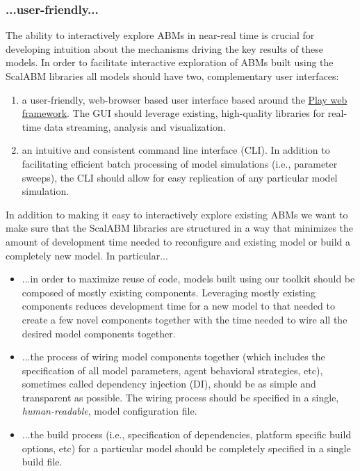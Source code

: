 \documentclass[11pt]{amsart}
\begin{document}
\subsubsection{...user-friendly...}
The ability to interactively explore ABMs in near-real time is crucial for developing intuition about the mechanisms driving the key results of these models. In order to facilitate interactive exploration of ABMs built using the ScalABM libraries all models should have two, complementary user interfaces:
\begin{enumerate}
    \item a user-friendly, web-browser based user interface based around the \href{https://www.playframework.com/}{Play web framework}. The GUI should leverage existing, high-quality libraries for real-time data streaming, analysis and visualization.
    \item an intuitive and consistent command line interface (CLI). In addition to facilitating efficient batch processing of model simulations (i.e., parameter sweeps), the CLI should allow for easy replication of any particular model simulation.
\end{enumerate}

In addition to making it easy to interactively explore existing ABMs we want to make sure that the ScalABM libraries are structured in a way that minimizes the amount of development time needed to reconfigure and existing model or build a completely new model. In particular...
\begin{itemize}
    \item ...in order to maximize reuse of code, models built using our toolkit should be composed of mostly existing components. Leveraging mostly existing components reduces development time for a new model to that needed to create a few novel components together with the time needed to wire all the desired model components together.
    \item ...the process of wiring model components together (which includes the specification of all model parameters, agent behavioral strategies, etc), sometimes called dependency injection (DI), should be as simple and transparent as possible. The wiring process should be specified in a single, \textit{human-readable}, model configuration file.
    \item ...the build process (i.e., specification of dependencies, platform specific build options, etc) for a particular model should be completely specified in a single build file.
\end{itemize}
\end{document}
